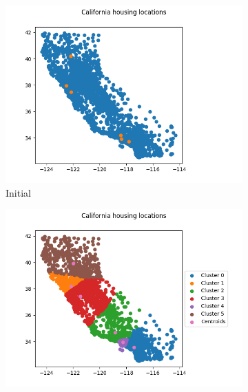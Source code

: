 \documentclass[a4paper]{article}
\begin{document}
\begin{figure}[!htp]
	\begin{subfigure}{0.5\columnwidth}
		\centering
		\includegraphics[width=\textwidth]{images/0.png}
		\caption{Initial }
		\label{figure:inital-nodes}
	\end{subfigure}\hfill
	\begin{subfigure}{0.5\columnwidth}
		\centering
		\includegraphics[width=\textwidth]{images/1.png}
		\caption{}
		\label{figure:iteration-1}
	\end{subfigure}
	

\end{figure}
\end{document}

